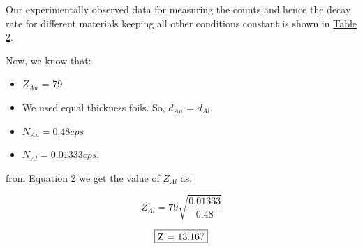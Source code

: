 		Our experimentally observed data for measuring the counts and hence the decay rate for different materials keeping all other conditions constant is shown in \hyperref[tab:2]{Table 2}.

		

		Now, we know that:
		\begin{itemize}
			\item $Z_{Au}$ = 79
			\item We used equal thickness foils. So, $d_{Au}$ = $d_{Al}$.
			\item $N_{Au} = 0.48cps$ 
			\item $N_{Al} = 0.01333cps$.
		\end{itemize}

		from \hyperref[eq:2]{Equation 2} we get the value of $Z_{Al}$ as:

		$$Z_{Al} = 79\sqrt{\frac{0.01333}{0.48}}$$

		$$\fbox{Z = 13.167}$$
